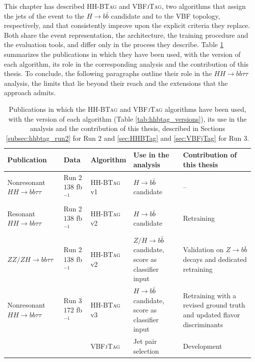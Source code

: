 %
\noindent This chapter has described \textsc{HH-BTag} and \textsc{VBFjTag}, two algorithms that assign the jets of the event to the $H\to b\bar{b}$ candidate and to the VBF topology, respectively, and that consistently improve upon the explicit criteria they replace. Both share the event representation, the architecture, the training procedure and the evaluation tools, and differ only in the process they describe. Table \ref{tab:taggers_publications} summarizes the publications in which they have been used, with the version of each algorithm, its role in the corresponding analysis and the contribution of this thesis. To conclude, the following paragraphs outline their role in the $HH\to bb\tau\tau$ analysis, the limits that lie beyond their reach and the extensions that the approach admits.\medskip
\begin{table}[t]
\centering
\small
\setlength{\tabcolsep}{4pt}
\begin{tabular}{>{\raggedright\arraybackslash}p{3.0cm}>{\raggedright\arraybackslash}p{1.5cm}>{\raggedright\arraybackslash}p{2.0cm}>{\raggedright\arraybackslash}p{4.0cm}>{\raggedright\arraybackslash}p{4.0cm}}
\toprule
Publication & Data & Algorithm & Use in the analysis & Contribution of this thesis \\
\midrule
Nonresonant $HH\to bb\tau\tau$~\cite{CMS-HIG-20-010} & Run 2 \newline $138$ fb$^{-1}$ & \textsc{HH-BTag} v1 & $H\to b\bar{b}$ candidate & -- \\
\addlinespace
Resonant $HH\to bb\tau\tau$~\cite{CMS-PAS-B2G-24-011} & Run 2 \newline $138$ fb$^{-1}$ & \textsc{HH-BTag} v2 & $H\to b\bar{b}$ candidate & Retraining \\
\addlinespace
$ZZ/ZH\to bb\tau\tau$~\cite{CMS:2026zzzh} & Run 2 \newline $138$ fb$^{-1}$ & \textsc{HH-BTag} v2 & $Z/H\to b\bar{b}$ candidate, score as classifier input & Validation on $Z\to b\bar{b}$ decays and dedicated retraining \\
\midrule
Nonresonant $HH\to bb\tau\tau$~\cite{CMS-PAS-HIG-25-008} & Run 3 \newline $172$ fb$^{-1}$ & \textsc{HH-BTag} v3 & $H\to b\bar{b}$ candidate, score as classifier input & Retraining with a revised ground truth and updated flavor discriminants \\
\addlinespace
 & & \textsc{VBFjTag} & Jet pair selection & Development \\
\bottomrule
\end{tabular}
\caption{Publications in which the \textsc{HH-BTag} and \textsc{VBFjTag} algorithms have been used, with the version of each algorithm (Table \ref{tab:hhbtag_versions}), its use in the analysis and the contribution of this thesis, described in Sections \ref{subsec:hhbtag_run2} for Run 2 and \ref{sec:HHBTag} and \ref{sec:VBFjTag} for Run 3.}
\label{tab:taggers_publications}
\end{table}



